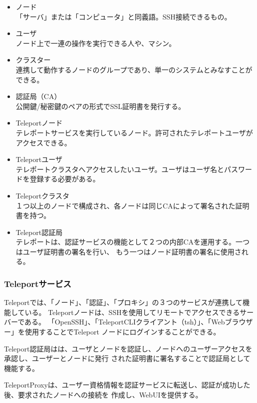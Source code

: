 \documentclass[11pt,a4j,titlepage]{jreport}
\begin{document}
    
        
\begin{itemize}
    \setlength{\parskip}{0.1cm} %
    \setlength{\itemsep}{0.1cm}
    \item ノード\mbox{}\\「サーバ」または「コンピュータ」と同義語。SSH接続できるもの。
    \item ユーザ\mbox{}\\ノード上で一連の操作を実行できる人や、マシン。
    \item クラスター\mbox{}\\連携して動作するノードのグループであり、単一のシステムとみなすことができる。
    \item 認証局（CA）\mbox{}\\公開鍵/秘密鍵のペアの形式でSSL証明書を発行する。
    \item Teleportノード\mbox{}\\テレポートサービスを実行しているノード。許可されたテレポートユーザがアクセスできる。
    \item Teleportユーザ\mbox{}\\テレポートクラスタへアクセスしたいユーザ。ユーザはユーザ名とパスワードを登録する必要がある。
    \item Teleportクラスタ\mbox{}\\１つ以上のノードで構成され、各ノードは同じCAによって署名された証明書を持つ。
    
    \item Teleport認証局\mbox{}\\テレポートは、認証サービスの機能として２つの内部CAを運用する。一つはユーザ証明書の署名を行い、
    もう一つはノード証明書の署名に使用される。

    
\end{itemize}

\subsubsection{Teleportサービス}
Teleportでは、「ノード」、「認証」、「プロキシ」の３つのサービスが連携して機能している。
Teleportノードは、SSHを使用してリモートでアクセスできるサーバーである。
「OpenSSH」、「TeleportCLIクライアント（tsh）」、「Webブラウザー」を使用することでTeleport
ノードにログインすることができる。

Teleport認証局はは、ユーザとノードを認証し、ノードへのユーザーアクセスを承認し、ユーザーとノードに発行
された証明書に署名することで認証局として機能する。\par
TeleportProxyは、ユーザー資格情報を認証サービスに転送し、認証が成功した後、要求されたノードへの接続を
作成し、WebUIを提供する。
\end{document}
